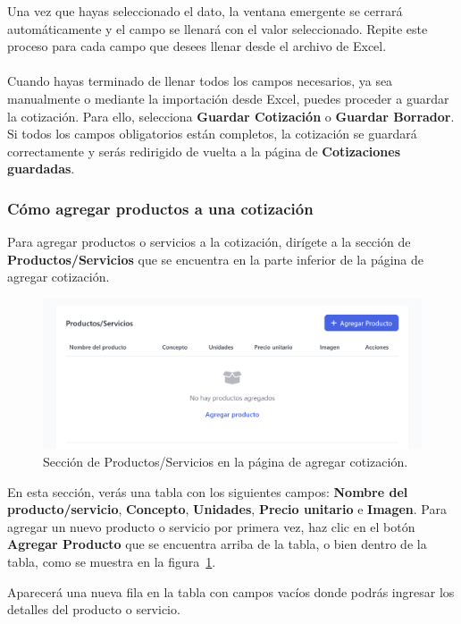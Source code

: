\documentclass{Pretexto/bluereport}
\begin{document}
Una vez que hayas seleccionado el dato, la ventana emergente se cerrará automáticamente y el campo se llenará 
con el valor seleccionado. Repite este proceso para cada campo que desees llenar desde el archivo de Excel.
\\\\
Cuando hayas terminado de llenar todos los campos necesarios, ya sea manualmente o mediante la importación desde Excel,
puedes proceder a guardar la cotización. Para ello, selecciona \textbf{Guardar Cotización} o \textbf{Guardar Borrador}.
 Si todos los campos obligatorios están completos, la cotización se 
guardará correctamente y serás redirigido de vuelta a la página de \textbf{Cotizaciones guardadas}.

\subsubsection{Cómo agregar productos a una cotización}
Para agregar productos o servicios a la cotización, dirígete a la sección de \textbf{Productos/Servicios} que se encuentra 
en la parte inferior de la página de agregar cotización.
\begin{figure}[H] 
    \centering
        \includegraphics[width=0.75\linewidth]{img/seccion_productos.png}
    \caption{Sección de Productos/Servicios en la página de agregar cotización.}
    \label{fig:seccion_productos}
\end{figure}
En esta sección, verás una tabla con los siguientes campos: \textbf{Nombre del producto/servicio}, \textbf{Concepto}, \textbf{Unidades}, 
\textbf{Precio unitario} e \textbf{Imagen}.
Para agregar un nuevo producto o servicio por primera vez, haz clic en el botón \textbf{Agregar Producto} que se encuentra arriba 
de la tabla, o bien dentro de la tabla, como se muestra en la figura~\ref{fig:seccion_productos}.

Aparecerá una nueva fila en la tabla con campos vacíos donde podrás ingresar los detalles del producto o servicio.
\end{document}
